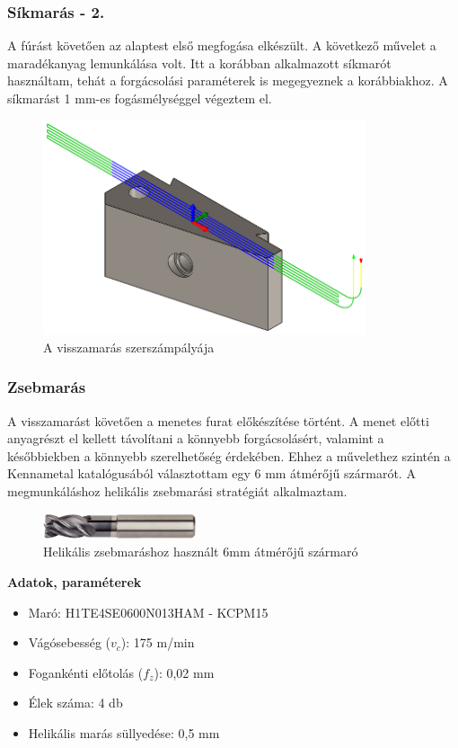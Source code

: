 \documentclass[12pt,a4paper,oneside]{report}
\begin{document}
\subsubsection{Síkmarás - 2.}
A fúrást követően az alaptest első megfogása elkészült. A következő művelet a maradékanyag lemunkálása volt. Itt a korábban alkalmazott síkmarót használtam, tehát a forgácsolási paraméterek is megegyeznek a korábbiakhoz. A síkmarást 1 mm-es fogásmélységgel végeztem el.

\begin{figure}[H]
    \centering
    \includegraphics[width=9.5cm]{figures/alaptest_facemill_2.png}
    \caption{A visszamarás szerszámpályája}
    \label{Fig:alaptest_facemill_2}
\end{figure}

\subsubsection{Zsebmarás}
A visszamarást követően a menetes furat előkészítése történt. A menet előtti anyagrészt el kellett távolítani a könnyebb forgácsolásért, valamint a későbbiekben a könnyebb szerelhetőség érdekében. Ehhez a művelethez szintén a Kennametal katalógusából választottam egy 6 mm átmérőjű szármarót. A megmunkáláshoz helikális zsebmarási stratégiát alkalmaztam.

\begin{figure}[H]
    \centering
    \includegraphics[width=4.5cm]{figures/d10_flatmill.png}
    \caption{Helikális zsebmaráshoz használt 6mm átmérőjű szármaró}
    \label{Fig:d6_flatmill}
\end{figure}

\textbf{Adatok, paraméterek}
\begin{itemize}
    \item Maró: H1TE4SE0600N013HAM - KCPM15
    \item Vágósebesség ($v_c$): 175 m/min
    \item Fogankénti előtolás ($f_z$): 0,02 mm
    \item Élek száma: 4 db
    \item Helikális marás süllyedése: 0,5 mm
\end{itemize}
\end{document}
